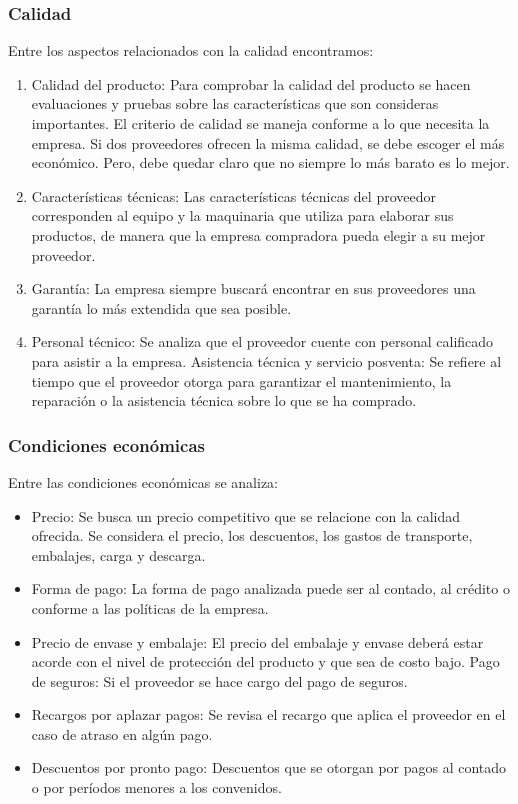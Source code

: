 \documentclass[../main]{subfiles}
\begin{document}
\subsubsection{Calidad}
Entre los aspectos relacionados con la calidad encontramos:
\begin{enumerate}
    \item Calidad del producto: Para comprobar la calidad del producto se hacen evaluaciones y pruebas sobre las características que son consideras importantes. El criterio de calidad se maneja conforme a lo que necesita la empresa. Si dos proveedores ofrecen la misma calidad, se debe escoger el más económico. Pero, debe quedar claro que no siempre lo más barato es lo mejor.
\item Características técnicas: Las características técnicas del proveedor corresponden al equipo y la maquinaria que utiliza para elaborar sus productos, de manera que la empresa compradora pueda elegir a su mejor proveedor.
\item Garantía: La empresa siempre buscará encontrar en sus proveedores una garantía lo más extendida que sea posible.
\item Personal técnico: Se analiza que el proveedor cuente con personal calificado para asistir a la empresa.
Asistencia técnica y servicio posventa: Se refiere al tiempo que el proveedor otorga para garantizar el mantenimiento, la reparación o la asistencia técnica sobre lo que se ha comprado.
\end{enumerate}

\subsubsection{Condiciones económicas}


Entre las condiciones económicas se analiza:
\begin{itemize}
    \item Precio: Se busca un precio competitivo que se relacione con la calidad ofrecida. Se considera el precio, los descuentos, los gastos de transporte, embalajes, carga y descarga.
\item Forma de pago: La forma de pago analizada puede ser al contado, al crédito o conforme a las políticas de la empresa.
\item Precio de envase y embalaje: El precio del embalaje y envase deberá estar acorde con el nivel de protección del producto y que sea de costo bajo.
Pago de seguros: Si el proveedor se hace cargo del pago de seguros.
\item Recargos por aplazar pagos: Se revisa el recargo que aplica el proveedor en el caso de atraso en algún pago.
\item Descuentos por pronto pago: Descuentos que se otorgan por pagos al contado o por períodos menores a los convenidos.
\end{itemize}
\end{document}

